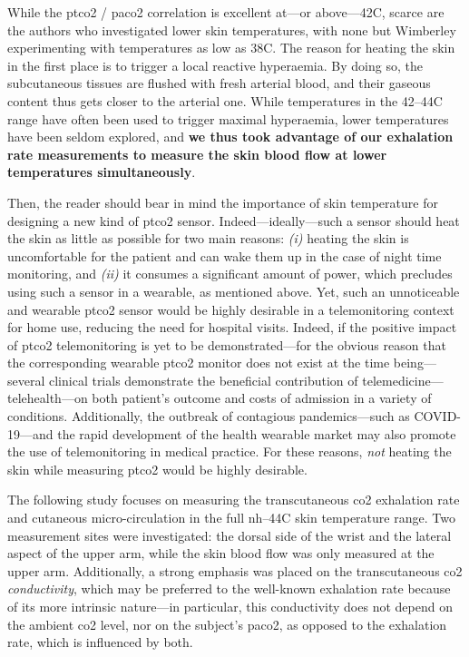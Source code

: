 While the \gls{ptco2} / \gls{paco2} correlation is excellent at---or above---42{\degree}C\cite{conway2018}, scarce are the authors who investigated lower skin temperatures, with none but Wimberley \etal{}\cite{wimberley1985a} experimenting with temperatures as low as 38{\degree}C. The reason for heating the skin in the first place is to trigger a local reactive hyperaemia\cite{roustit2012}. By doing so, the subcutaneous tissues are flushed with fresh arterial blood, and their gaseous content thus gets closer to the arterial one\cite{koch1965, rooth1987, zavorsky2007}. While temperatures in the 42--44{\degree}C range have often been used to trigger maximal hyperaemia, lower temperatures have been seldom explored\cite{hodges2016}, and \textbf{we thus took advantage of our exhalation rate measurements to measure the skin blood flow at lower temperatures simultaneously}.

Then, the reader should bear in mind the importance of skin temperature for designing a new kind of \gls{ptco2} sensor. Indeed---ideally---such a sensor should heat the skin as little as possible for two main reasons: \textit{(i)} heating the skin is uncomfortable for the patient and can wake them up in the case of night time monitoring, and \textit{(ii)} it consumes a significant amount of power, which precludes using such a sensor in a wearable, as mentioned above. Yet, such an unnoticeable and wearable \gls{ptco2} sensor would be highly desirable in a telemonitoring context for home use, reducing the need for hospital visits. Indeed, if the positive impact of \gls{ptco2} telemonitoring is yet to be demonstrated---for the obvious reason that the corresponding wearable \gls{ptco2} monitor does not exist at the time being---several clinical trials demonstrate the beneficial contribution of telemedicine---\aka{} telehealth---on both patient's outcome and costs of admission in a variety of conditions\cite{steventon2012, kruse2019, yun2018}. Additionally, the outbreak of contagious pandemics---such as COVID-19\cite{garfan2021}---and the rapid development of the health wearable market\cite{dunn2018, yetisen2018, chung2019, dagher2020} may also promote the use of telemonitoring in medical practice. For these reasons, \emph{not} heating the skin while measuring \gls{ptco2} would be highly desirable.

The following study focuses on measuring the transcutaneous \gls{co2} exhalation rate and cutaneous micro-circulation in the full \gls{nh}--44{\degree}C skin temperature range. Two measurement sites were investigated: the dorsal side of the wrist and the lateral aspect of the upper arm, while the skin blood flow was only measured at the upper arm. Additionally, a strong emphasis was placed on the transcutaneous \gls{co2} \emph{conductivity}, which may be preferred to the well-known exhalation rate because of its more intrinsic nature---in particular, this conductivity does not depend on the ambient \gls{co2} level, nor on the subject's \gls{paco2}, as opposed to the exhalation rate, which is influenced by both.

